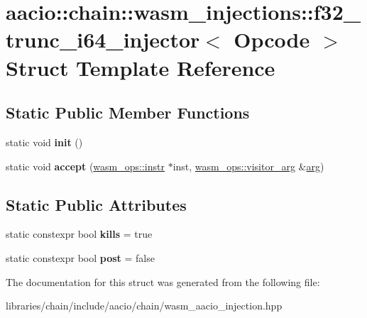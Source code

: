 \hypertarget{structaacio_1_1chain_1_1wasm__injections_1_1f32__trunc__i64__injector}{}\section{aacio\+:\+:chain\+:\+:wasm\+\_\+injections\+:\+:f32\+\_\+trunc\+\_\+i64\+\_\+injector$<$ Opcode $>$ Struct Template Reference}
\label{structaacio_1_1chain_1_1wasm__injections_1_1f32__trunc__i64__injector}
\subsection*{Static Public Member Functions}
\begin{DoxyCompactItemize}
\item 
\mbox{\label{structaacio_1_1chain_1_1wasm__injections_1_1f32__trunc__i64__injector_ae72bf22ff1ba66d8abf5bb97cdefcbf7}} 
static void {\bfseries init} ()
\item 
\mbox{\label{structaacio_1_1chain_1_1wasm__injections_1_1f32__trunc__i64__injector_a49f7e40e20687fcbcf5ee6bc1eb41071}} 
static void {\bfseries accept} (\mbox{\hyperlink{structaacio_1_1chain_1_1wasm__ops_1_1instr}{wasm\+\_\+ops\+::instr}} $\ast$inst, \mbox{\hyperlink{structaacio_1_1chain_1_1wasm__ops_1_1visitor__arg}{wasm\+\_\+ops\+::visitor\+\_\+arg}} \&\mbox{\hyperlink{unionarg}{arg}})
\end{DoxyCompactItemize}
\subsection*{Static Public Attributes}
\begin{DoxyCompactItemize}
\item 
\mbox{\label{structaacio_1_1chain_1_1wasm__injections_1_1f32__trunc__i64__injector_a3b4027871df9d0cfbda82b0a1f67303f}} 
static constexpr bool {\bfseries kills} = true
\item 
\mbox{\label{structaacio_1_1chain_1_1wasm__injections_1_1f32__trunc__i64__injector_ae26c708dad7653ded1ac4266dab0c0f4}} 
static constexpr bool {\bfseries post} = false
\end{DoxyCompactItemize}


The documentation for this struct was generated from the following file\+:\begin{DoxyCompactItemize}
\item 
libraries/chain/include/aacio/chain/wasm\+\_\+aacio\+\_\+injection.\+hpp\end{DoxyCompactItemize}
